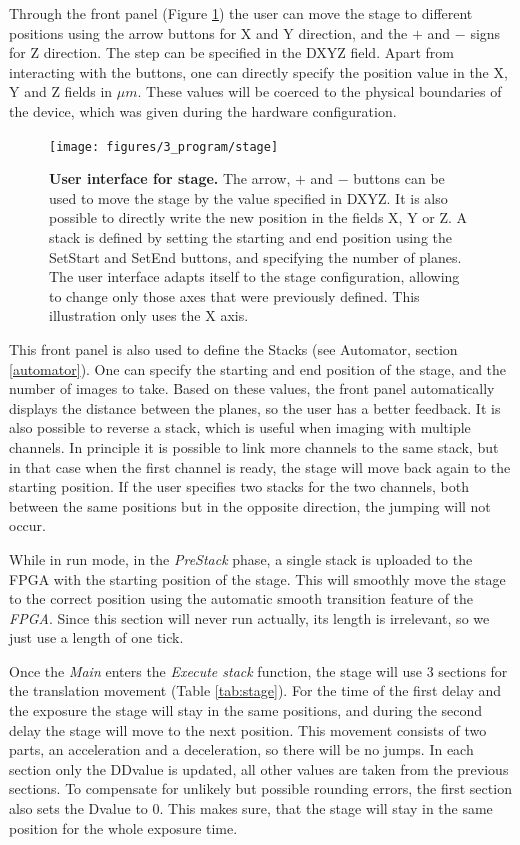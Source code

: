 \documentclass{tdk_style}
\begin{document}
Through the front panel (Figure \ref{fig:ui_stage}) the user can move the stage to different positions using the arrow buttons for X and Y direction, and the $+$ and $-$ signs for Z direction. The step can be specified in the DXYZ field. Apart from interacting with the buttons, one can directly specify the position value in the X, Y and Z fields in $\mu m$. These values will be coerced to the physical boundaries of the device, which was given during the hardware configuration.

\begin{figure}[htbp]
	\centering
	\texttt{[image: figures/3\_program/stage]}
	\caption{\textbf{User interface for stage.} The arrow, $+$ and $-$ buttons can be used to move the stage by the value specified in DXYZ. It is also possible to directly write the new position in the fields X, Y or Z. A stack is defined by setting the starting and end position using the SetStart and SetEnd buttons, and specifying the number of planes. The user interface adapts itself to the stage configuration, allowing to change only those axes that were previously defined. This illustration only uses the X axis.}
	\label{fig:ui_stage}
\end{figure}

This front panel is also used to define the Stacks (see Automator, section \ref{automator}). One can specify the starting and end position of the stage, and the number of images to take. Based on these values, the front panel automatically displays the distance between the planes, so the user has a better feedback. It is also possible to reverse a stack, which is useful when imaging with multiple channels. In principle it is possible to link more channels to the same stack, but in that case when the first channel is ready, the stage will move back again to the starting position. If the user specifies two stacks for the two channels, both between the same positions but in the opposite direction, the jumping will not occur.

While in run mode, in the \emph{PreStack} phase, a single stack is uploaded to the FPGA with the starting position of the stage. This will smoothly move the stage to the correct position using the automatic smooth transition feature of the \emph{FPGA}. Since this section will never run actually, its length is irrelevant, so we just use a length of one tick.

Once the \emph{Main} enters the \emph{Execute stack} function, the stage will use 3 sections for the translation movement (Table \ref{tab:stage}). For the time of the first delay and the exposure the stage will stay in the same positions, and during the second delay the stage will move to the next position. This movement consists of two parts, an acceleration and a deceleration, so there will be no jumps. In each section only the DDvalue is updated, all other values are taken from the previous sections. To compensate for unlikely but possible rounding errors, the first section also sets the Dvalue to 0. This makes sure, that the stage will stay in the same position for the whole exposure time.
\end{document}
